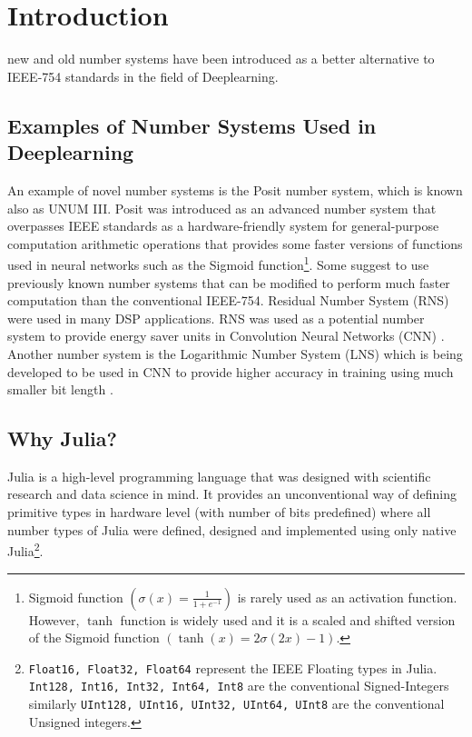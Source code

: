 \section{Introduction}

 new and old number systems have been introduced as a better alternative to IEEE-754 standards\cite{754} in the field of Deeplearning.

\subsection{Examples of Number Systems Used in Deeplearning}

An example of novel number systems is the Posit number system\cite{Gustafson2017}, which is known also as UNUM III. Posit was introduced as an advanced number system that overpasses IEEE standards as a hardware-friendly system for general-purpose computation arithmetic operations that provides some faster versions of functions used in neural networks such as the Sigmoid function\footnote{Sigmoid function $\left(\sigma(x) = \frac{1}{1 + e^{-1}}\right)$ is rarely used as an activation function. However, $\tanh$ function is widely used and it is a scaled and shifted version of the Sigmoid function $\left(\tanh(x) = 2 \sigma(2x) -1\right)$.}. Some suggest to use previously known number systems that can be modified to perform much faster computation than the conventional IEEE-754. Residual Number System (RNS) \cite{Garner1959} were used in many DSP applications. RNS was used as a potential number system to provide energy saver units in Convolution Neural Networks (CNN) \cite{Miyashita2016}. Another number system is the Logarithmic Number System (LNS) \cite{Kingsbury1971,Alexopoulos1975,Lee1977} which is being developed to be used in CNN to provide higher accuracy in training using much smaller bit length \cite{Miyashita2016}.

\subsection{Why Julia?}

Julia \cite{Julia,Bezanson2017} is a high-level programming language that was designed with scientific research and data science in mind. It provides an unconventional way of defining primitive types in hardware level (with number of bits predefined) where all number types of Julia were defined, designed and implemented using only native Julia\footnote{\texttt{Float16, Float32, Float64} represent the IEEE Floating types in Julia. \texttt{Int128, Int16, Int32, Int64, Int8} are the conventional Signed-Integers similarly \texttt{UInt128, UInt16, UInt32, UInt64, UInt8} are the conventional Unsigned integers.}.

